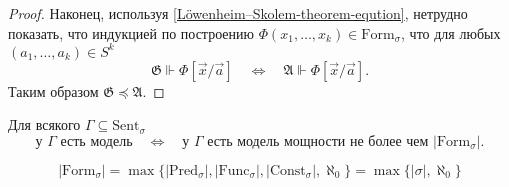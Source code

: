 \documentclass[12pt,a4paper]{article}
\newcommand{\Formul}{\ensuremath{\mathrm{Form}}\xspace}
\newcommand{\Pred}{\ensuremath{\mathrm{Pred}}\xspace}
\newcommand{\Func}{\ensuremath{\mathrm{Func}}\xspace}
\newcommand{\Const}{\ensuremath{\mathrm{Const}}\xspace}
\newcommand{\Sent}{\ensuremath{\mathrm{Sent}}\xspace}
\begin{document}
\begin{proof}
        Наконец, используя \ref{Löwenheim–Skolem-theorem-eqution}, нетрудно показать, что индукцией по построению $\Phi(x_1, \dots, x_k) \in \Formul_\sigma$, что для любых $(a_1, \dots, a_k) \in S^k$
        \[
            \mathfrak{G} \Vdash \Phi[\vec{x}/\vec{a}]
            \quad \Longleftrightarrow \quad
            \mathfrak{A} \Vdash \Phi[\vec{x}/\vec{a}].
        \]
        Таким образом $\mathfrak{G} \preccurlyeq \mathfrak{A}$.
    \end{proof}

    \begin{corollary}
        Для всякого $\Gamma \subseteq \Sent_\sigma$
        \[
            \text{у $\Gamma$ есть модель}
            \quad \Longleftrightarrow \quad
            \text{у $\Gamma$ есть модель мощности не более чем $|\Formul_\sigma|$.}
        \]
    \end{corollary}

    \begin{exercise}
        \[
            |\Formul_\sigma|
            = \max \{|\Pred_\sigma|, |\Func_\sigma|, |\Const_\sigma|, \aleph_0\}
            = \max \{|\sigma|, \aleph_0\}
        \]
    \end{exercise}
\end{document}
